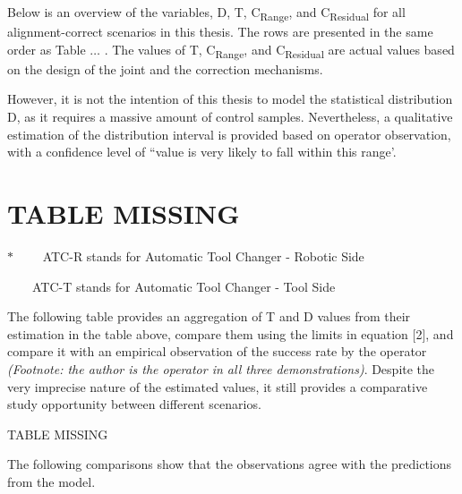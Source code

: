 \documentclass[11pt]{book}
\begin{document}
Below is an overview of the variables, D, T, C\textsubscript{Range}, and C\textsubscript{Residual} for all alignment-correct scenarios in this thesis. The rows are presented in the same order as Table $\ldots$ . The values of T, C\textsubscript{Range}, and C\textsubscript{Residual }are actual values based on the design of the joint and the correction mechanisms. 

However, it is not the intention of this thesis to model the statistical distribution D, as it requires a massive amount of control samples. Nevertheless, a qualitative estimation of the distribution interval is provided based on operator observation, with a confidence level of ``value is very likely to fall within this range’.

\section{TABLE MISSING}

\vspace{2\baselineskip}
{\footnotesize $\ast$ \ \ \ \ ATC-R stands for Automatic Tool Changer - Robotic Side}

{\footnotesize \ \ \ \ ATC-T stands for Automatic Tool Changer - Tool Side}

\vspace{1\baselineskip}
The following table provides an aggregation of T and D values from their estimation in the table above, compare them using the limits in equation [2], and compare it with an empirical observation of the success rate by the operator \textit{(Footnote: the author is the operator in all three demonstrations)}. Despite the very imprecise nature of the estimated values, it still provides a comparative study opportunity between different scenarios.

{\footnotesize TABLE MISSING}

\vspace{1\baselineskip}
The following comparisons show that the observations agree with the predictions from the model.
\end{document}
